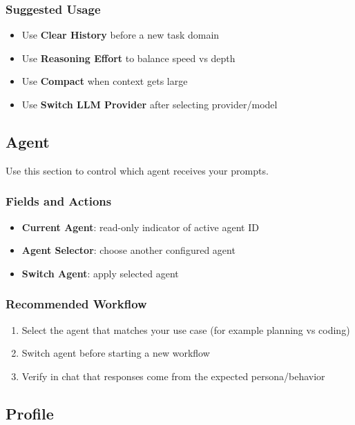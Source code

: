 \documentclass{article}
\begin{document}
\subsubsection{Suggested Usage}
\begin{itemize}
	\item Use \textbf{Clear History} before a new task domain
	\item Use \textbf{Reasoning Effort} to balance speed vs depth
	\item Use \textbf{Compact} when context gets large
	\item Use \textbf{Switch LLM Provider} after selecting provider/model
\end{itemize}

\subsection{Agent}

Use this section to control which agent receives your prompts.

\subsubsection{Fields and Actions}
\begin{itemize}
	\item \textbf{Current Agent}: read-only indicator of active agent ID
	\item \textbf{Agent Selector}: choose another configured agent
	\item \textbf{Switch Agent}: apply selected agent
\end{itemize}

\subsubsection{Recommended Workflow}
\begin{enumerate}
	\item Select the agent that matches your use case (for example planning vs coding)
	\item Switch agent before starting a new workflow
	\item Verify in chat that responses come from the expected persona/behavior
\end{enumerate}

\subsection{Profile}
\end{document}
